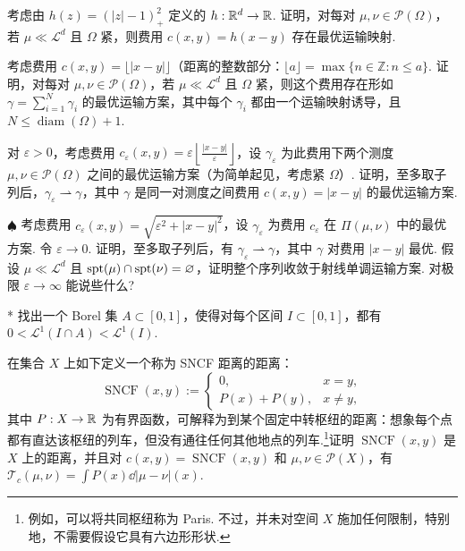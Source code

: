 \begin{exercise}\label{ex:16}
考虑由 $h(z)=(|z|-1)_+^2$ 定义的 $h:\mathbb R^d\to\mathbb R$. 证明，对每对 $\mu,\nu\in\mathscr P(\Omega)$，若 $\mu\ll\mathscr L^d$ 且 $\Omega$ 紧，则费用 $c(x,y)=h(x-y)$ 存在最优运输映射.
\end{exercise}

\begin{exercise}\label{ex:17}
考虑费用 $c(x,y)=\lfloor|x-y|\rfloor$（距离的整数部分：$\lfloor a\rfloor=\max\{n\in\mathbb Z:n\leq a\}$. 证明，对每对 $\mu,\nu\in\mathscr P(\Omega)$，若 $\mu\ll\mathscr L^d$ 且 $\Omega$ 紧，则这个费用存在形如 $\gamma=\sum_{i=1}^N\gamma_i$ 的最优运输方案，其中每个 $\gamma_i$ 都由一个运输映射诱导，且 $N\leq\operatorname{diam}(\Omega)+1$.
\end{exercise}

\begin{exercise}\label{ex:18}
对 $\varepsilon>0$，考虑费用 $c_\varepsilon(x,y)=\varepsilon\left\lfloor\frac{|x-y|}\varepsilon\right\rfloor$，设 $\gamma_\varepsilon$ 为此费用下两个测度 $\mu,\nu\in\mathscr P(\Omega)$ 之间的最优运输方案（为简单起见，考虑紧 $\Omega$）. 证明，至多取子列后，$\gamma_\varepsilon\rightharpoonup\gamma$，其中 $\gamma$ 是同一对测度之间费用 $c(x,y)=|x-y|$ 的最优运输方案.
\end{exercise}

\begin{exercise}\label{ex:19}
$\spadesuit$ 考虑费用 $c_\varepsilon(x,y)=\sqrt{\varepsilon^2+|x-y|^2}$，设 $\gamma_\varepsilon$ 为费用 $c_\varepsilon$ 在 $\Pi(\mu,\nu)$ 中的最优方案. 令 $\varepsilon\to0$. 证明，至多取子列后，有 $\gamma_\varepsilon\rightharpoonup\gamma$，其中 $\gamma$ 对费用 $|x-y|$ 最优. 假设 $\mu\ll\mathscr L^d$ 且 $\operatorname{spt}(\mu)\cap\operatorname{spt}(\nu)=\varnothing$，证明整个序列收敛于射线单调运输方案. 对极限 $\varepsilon\to\infty$ 能说些什么?
\end{exercise}

\begin{exercise}\label{ex:20}
* 找出一个 Borel 集 $A\subset[0,1]$，使得对每个区间 $I\subset[0,1]$，都有 $0<\mathscr L^1(I\cap A)<\mathscr L^1(I)$.
\end{exercise}

\begin{exercise}\label{ex:21}
在集合 $X$ 上如下定义一个称为 SNCF 距离的距离：
\[
\operatorname{SNCF}(x,y):=\begin{cases}
0,&x=y,\\
P(x)+P(y),&x\neq y,
\end{cases}
\]
其中 $P:X\to\mathbb R$ 为有界函数，可解释为到某个固定中转枢纽的距离：想象每个点都有直达该枢纽的列车，但没有通往任何其他地点的列车.\footnote{例如，可以将共同枢纽称为 Paris. 不过，并未对空间 $X$ 施加任何限制，特别地，不需要假设它具有六边形形状.}证明 $\operatorname{SNCF}(x,y)$ 是 $X$ 上的距离，并且对 $c(x,y)=\operatorname{SNCF}(x,y)$ 和 $\mu,\nu\in\mathscr P(X)$，有 $\mathscr T_c(\mu,\nu)=\int P(x)\dd|\mu-\nu|(x)$.
\end{exercise}

